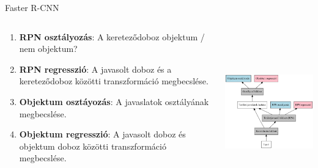 \documentclass[english, aspectratio=169]{beamer}
\begin{document}
\begin{frame}{Faster R-CNN}
\begin{columns}
\begin{column}{.5\textwidth}
\begin{enumerate}
	\item \textbf{RPN osztályozás}: A kereteződoboz objektum / nem objektum?
	\item \textbf{RPN regresszió}: A javasolt doboz és a kereteződoboz közötti transzformáció megbecslése.
	\item \textbf{Objektum osztáyozás}: A javaslatok osztályának megbecslése.
	\item \textbf{Objektum regresszió}: A javasolt doboz és objektum doboz közötti transzformáció megbecslése. 
\end{enumerate}
\end{column}
\begin{column}{.5\textwidth}
\begin{center}
\includegraphics[width=7cm, height=7cm, keepaspectratio]{graphs/od_7.png}
\end{center}
\end{column}
\end{columns}
\end{frame}
\end{document}
